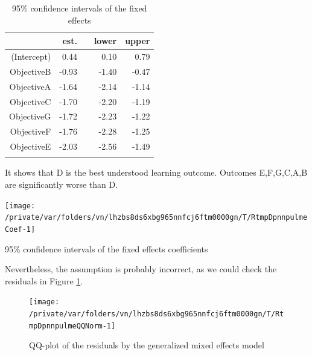 \documentclass[12pt,english,nohyper]{tufte-handout}\usepackage[]{graphicx}\usepackage[]{color}
\newenvironment{knitrout}{}{} %
\begin{document}
\begin{longtable}{rrlrr}
  \hline
 & est. &    & lower & upper \\ 
  \hline
(Intercept) & 0.44 &  & 0.10 & 0.79 \\ 
  ObjectiveB & -0.93 &  & -1.40 & -0.47 \\ 
  ObjectiveA & -1.64 &  & -2.14 & -1.14 \\ 
  ObjectiveC & -1.70 &  & -2.20 & -1.19 \\ 
  ObjectiveG & -1.72 &  & -2.23 & -1.22 \\ 
  ObjectiveF & -1.76 &  & -2.28 & -1.25 \\ 
  ObjectiveE & -2.03 &  & -2.56 & -1.49 \\ 
   \hline
\hline
\caption{95\% confidence intervals of the fixed effects} 
\label{tab:lme_fixed}
\end{longtable}


It shows that D is the best understood learning outcome.
Outcomes E,F,G,C,A,B are
significantly worse than D.



\begin{knitrout}
\color{fgcolor}\begin{marginfigure}
\texttt{[image: /private/var/folders/vn/lhzbs8ds6xbg965nnfcj6ftm0000gn/T/RtmpDpnnpulmeCoef-1]} \caption[95\% confidence intervals of the fixed effects coefficients]{95\% confidence intervals of the fixed effects coefficients}\label{mar:lmeCoef}
\end{marginfigure}


\end{knitrout}

Nevertheless, the assumption is probably incorrect, as we could check the residuals in
Figure \ref{fig:lmeQQNorm}.

\begin{knitrout}
\color{fgcolor}\begin{figure}

{\centering \texttt{[image: /private/var/folders/vn/lhzbs8ds6xbg965nnfcj6ftm0000gn/T/RtmpDpnnpulmeQQNorm-1]} 

}

\caption[QQ-plot of the residuals by the generalized mixed effects model]{QQ-plot of the residuals by the generalized mixed effects model}\label{fig:lmeQQNorm}
\end{figure}


\end{knitrout}
\end{document}
